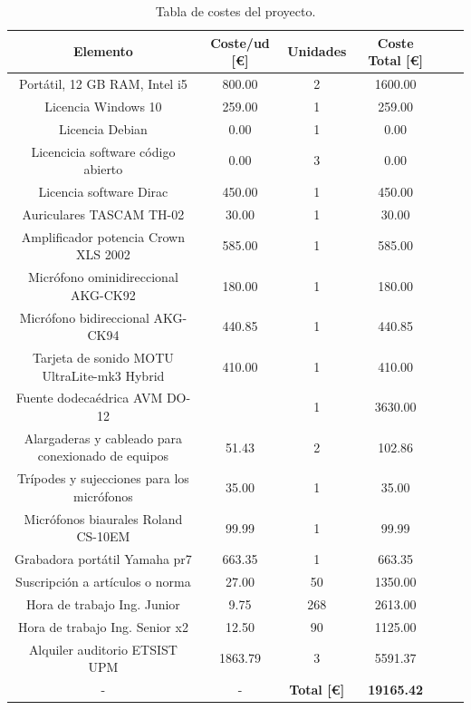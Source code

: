 \documentclass[11pt,a4paper]{book}
\begin{document}
        \begin{table}[H]
			\begin{center}
			\begin{scriptsize}
			\begin{tabular}{| c || c | c | c | c | c |}
				\hline
				\textbf{Elemento}&\textbf{Coste/ud [\euro]}&\textbf{Unidades}&\textbf{Coste Total [\euro]}\\ \hline
                Portátil, 12 GB RAM, Intel i5&800.00&2&1600.00\\ \hline
                Licencia Windows 10&259.00&1&259.00\\ \hline
                Licencia Debian&0.00&1&0.00\\ \hline
                Licencicia software código abierto&0.00&3&0.00\\ \hline
                Licencia software Dirac&450.00&1&450.00\\ \hline
                Auriculares TASCAM TH-02&30.00&1&30.00\\ \hline
                Amplificador potencia Crown XLS 2002&585.00&1&585.00\\ \hline
                Micrófono ominidireccional AKG-CK92&180.00&1&180.00\\ \hline
                Micrófono bidireccional AKG-CK94&440.85&1&440.85\\ \hline
                Tarjeta de sonido MOTU UltraLite-mk3 Hybrid&410.00&1&410.00\\ \hline
                Fuente dodecaédrica AVM DO-12&&1&3630.00\\ \hline
                Alargaderas y cableado para conexionado de equipos&51.43&2&102.86\\ \hline
                Trípodes y sujecciones para los micrófonos&35.00&1&35.00\\ \hline
                Micrófonos biaurales Roland CS-10EM&99.99&1&99.99\\ \hline
                Grabadora portátil Yamaha pr7&663.35&1&663.35\\ \hline
                Suscripción a artículos o norma&27.00&50&1350.00\\ \hline
                Hora de trabajo Ing. Junior&9.75&268&2613.00\\ \hline
                Hora de trabajo Ing. Senior x2&12.50&90&1125.00\\ \hline
                Alquiler auditorio ETSIST UPM&1863.79&3&5591.37\\ \hline
                -&-&\textbf{Total [\euro]}&\textbf{19165.42}\\ \hline
        
            \end{tabular}
			\caption{Tabla de costes del proyecto.}
			\label{table:tablaPresupuesto}
			\end{scriptsize}
			\end{center}	
		\end{table}
\end{document}
